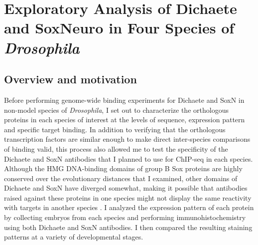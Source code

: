\chapter{Exploratory Analysis of Dichaete and SoxNeuro in Four Species of \emph{Drosophila}}

\hrulefill

\section{Overview and motivation}

Before performing genome-wide binding experiments for Dichaete and SoxN in non-model species of \emph{Drosophila}, I set out to characterize the orthologous proteins in each species of interest at the levels of sequence, expression pattern and specific target binding. In addition to verifying that the orthologous transcription factors are similar enough to make direct inter-species comparisons of binding valid, this process also allowed me to test the specificity of the Dichaete and SoxN antibodies that I planned to use for ChIP-seq in each species. Although the HMG DNA-binding domains of group B Sox proteins are highly conserved over the evolutionary distances that I examined, other domains of Dichaete and SoxN have diverged somewhat, making it possible that antibodies raised against these proteins in one species might not display the same reactivity with targets in another species \citep{mckimmie_conserved_2005}. I analyzed the expression pattern of each protein by collecting embryos from each species and performing immunohistochemistry using both Dichaete and SoxN antibodies. I then compared the resulting staining patterns at a variety of developmental stages.\\

